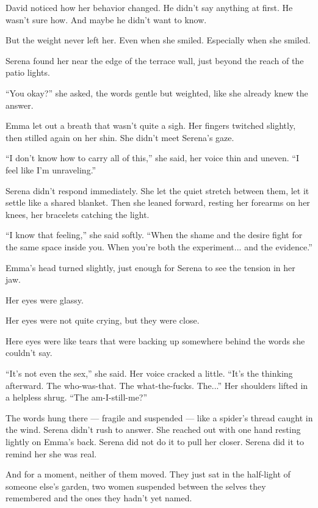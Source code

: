 \medskip

David noticed how her behavior changed. He didn’t say anything at first. He wasn’t sure how. 
And maybe he didn’t want to know. 

But the weight never left her. Even when she smiled. Especially when she smiled.

Serena found her near the edge of the terrace wall, just beyond the reach of the patio lights. 

``You okay?'' she asked, the words gentle but weighted, like she already knew the answer.

Emma let out a breath that wasn’t quite a sigh. Her fingers twitched slightly, then stilled again on her 
shin. She didn’t meet Serena’s gaze.

``I don’t know how to carry all of this,'' she said, her voice thin and uneven. ``I feel like I’m 
unraveling.''

Serena didn’t respond immediately. She let the quiet stretch between them, let it settle like a shared 
blanket. Then she leaned forward, resting her forearms on her knees, her bracelets catching the light.

``I know that feeling,'' she said softly. ``When the shame and the desire fight for the same space inside 
you. When you’re both the experiment... and the evidence.''

Emma’s head turned slightly, just enough for Serena to see the tension in her jaw. 

Her eyes were glassy. 

Her eyes were not quite crying, but they were close. 

Here eyes were like tears that were backing up somewhere behind the words she couldn’t 
say. 

``It’s not even the sex,'' she said. Her voice cracked a little. ``It’s the thinking afterward. The 
who-was-that. The what-the-fucks. The...'' Her shoulders lifted in a helpless shrug. 
``The am-I-still-me?''

The words hung there --- fragile and suspended --- like a spider’s thread caught in the wind. Serena didn’t 
rush to answer. She reached out with one hand resting lightly on Emma’s back. Serena did not do it 
to pull her closer. Serena did it to remind her she was real.

And for a moment, neither of them moved. They just sat in the half-light of someone else’s garden, 
two women suspended between the selves they remembered and the ones they hadn’t yet named.


